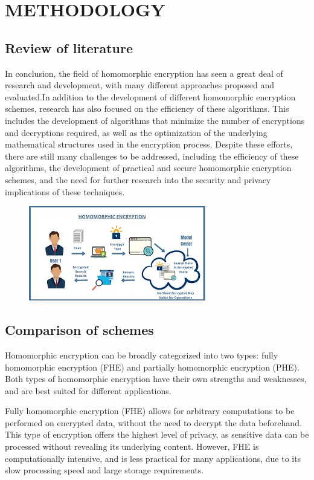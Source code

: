 \documentclass[a4paper,11pt]{report}
\begin{document}
\chapter{METHODOLOGY}

\section{Review of literature}
In conclusion, the field of homomorphic encryption has seen a great deal of research and development, with many different approaches proposed and evaluated.In addition to the development of different homomorphic encryption schemes, research has also focused on the efficiency of these algorithms. This includes the development of algorithms that minimize the number of encryptions and decryptions required, as well as the optimization of the underlying mathematical structures used in the encryption process. Despite these efforts, there are still many challenges to be addressed, including the efficiency of these algorithms, the development of practical and secure homomorphic encryption schemes, and the need for further research into the security and privacy implications of these techniques.
\begin{figure}[h]
	\centering
	\hspace{21pt}
	\includegraphics[width=.70\linewidth]{he.jpg}
	\label{fig:he.jpg}
\end{figure}
\section{Comparison of schemes}
Homomorphic encryption can be broadly categorized into two types: fully homomorphic encryption (FHE) and partially homomorphic encryption (PHE). Both types of homomorphic encryption have their own strengths and weaknesses, and are best suited for different applications.

Fully homomorphic encryption (FHE) allows for arbitrary computations to be performed on encrypted data, without the need to decrypt the data beforehand. This type of encryption offers the highest level of privacy, as sensitive data can be processed without revealing its underlying content. However, FHE is computationally intensive, and is less practical for many applications, due to its slow processing speed and large storage requirements.
\end{document}
